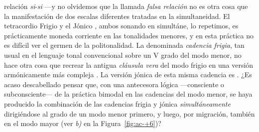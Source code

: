 \documentclass[a4paper,12pt]{article}
\begin{document}
\begin{multicols}{2}
relación \emph{si\bemoltxt}-\emph{si\becuadrotxt} ---y no olvidemos que la llamada \emph{falsa relación} no es otra cosa que la manifestación de dos escalas diferentes tratadas en la simultaneidad. El tetracordio Frigio  y el Jónico \hbox{,} ambos sonando en simultáne, lo repetimos, es prácticamente moneda corriente en las tonalidades menores, y en esta práctica no es difícil ver el germen de la politonalidad. La denominada \emph{cadencia frigia}, tan usual en el lenguaje tonal convencional sobre un V grado del modo menor, no hace otra cosa que recrear la antigua \emph{cláusula vera} del modo frigio  en una versión armónicamente más compleja \hbox{.} La versión jónica de esta misma cadencia es \hbox{.} ¿Es acaso descabellado pensar que, con una antecesora lógica ---consciente o subconsciente--- de la práctica bimodal en las cadencias del modo menor, se haya producido la combinación de las cadencias frigia y jónica \emph{simultáneamente} dirigiéndose al  grado de un modo menor primero, y luego, por migración, también en el modo mayor (ver \emph{b)} en la Figura~\ref{fig:ac-+6})?
\end{multicols}
\end{document}
